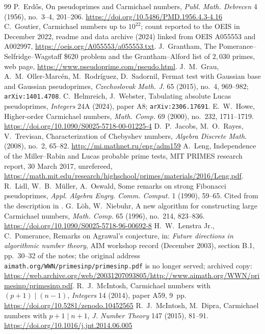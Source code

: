 \documentclass[11pt]{amsart}
\theoremstyle{definition}
\theoremstyle{remark}
\begin{document}
\begin{thebibliography}{99}
 P.~Erd\H{o}s, On pseudoprimes and Carmichael numbers, \emph{Publ. Math. Debrecen} 4 (1956), no.~3--4, 201--206. \url{https://doi.org/10.5486/PMD.1956.4.3-4.16}
 C.~Goutier, Carmichael numbers up to $10^{22}$; count reported to the OEIS in December 2022, readme and data archive (2024) linked from OEIS A055553 and A002997, \url{https://oeis.org/A055553/a055553.txt}.
 J.~Grantham, The Pomerance--Selfridge--Wagstaff \$620 problem and the Grantham--Alford list of $2{,}030$ primes, web page, \url{https://www.pseudoprime.com/pseudo.html}.
 J.~M.~Grau, A.~M.~Oller-Marc\'en, M.~Rodr\'iguez, D.~Sadornil, Fermat test with Gaussian base and Gaussian pseudoprimes, \emph{Czechoslovak Math. J.} 65 (2015), no.~4, 969--982; \texttt{arXiv:1401.4708}.
 C.~Helmreich, J.~Webster, Tabulating absolute Lucas pseudoprimes, \emph{Integers} 24A (2024), paper A8; \texttt{arXiv:2306.17691}.
 E.~W.~Howe, Higher-order Carmichael numbers, \emph{Math. Comp.} 69 (2000), no.~232, 1711--1719. \url{https://doi.org/10.1090/S0025-5718-00-01225-4}
 D.~P.~Jacobs, M.~O.~Rayes, V.~Trevisan, Characterization of Chebyshev numbers, \emph{Algebra Discrete Math.} (2008), no.~2, 65--82. \url{http://mi.mathnet.ru/eng/adm159}
 A.~Leng, Independence of the Miller--Rabin and Lucas probable prime tests, MIT PRIMES research report, 30 March 2017, unrefereed, \url{https://math.mit.edu/research/highschool/primes/materials/2016/Leng.pdf}.
 R.~Lidl, W.~B.~M\"uller, A.~Oswald, Some remarks on strong Fibonacci pseudoprimes, \emph{Appl. Algebra Engrg. Comm. Comput.} 1 (1990), 59--65. Cited from the description in \cite{Pinch07}.
 G.~L\"oh, W.~Niebuhr, A new algorithm for constructing large Carmichael numbers, \emph{Math. Comp.} 65 (1996), no.~214, 823--836. \url{https://doi.org/10.1090/S0025-5718-96-00692-8}
 H.~W.~Lenstra Jr., C.~Pomerance, Remarks on Agrawal's conjecture, in: \emph{Future directions in algorithmic number theory}, AIM workshop record (December 2003), section B.1, pp.~30--32 of the notes; the original address \texttt{aimath.org/WWN/primesinp/primesinp.pdf} is no longer served; archived copy: \url{https://web.archive.org/web/20031207093805/http://www.aimath.org/WWN/primesinp/primesinp.pdf}.
 R.~J.~McIntosh, Carmichael numbers with $(p+1)\mid(n-1)$, \emph{Integers} 14 (2014), paper A59, 9~pp. \url{https://doi.org/10.5281/zenodo.10452565}
 R.~J.~McIntosh, M.~Dipra, Carmichael numbers with $p+1\mid n+1$, \emph{J. Number Theory} 147 (2015), 81--91. \url{https://doi.org/10.1016/j.jnt.2014.06.005}

\end{thebibliography}
\end{document}
